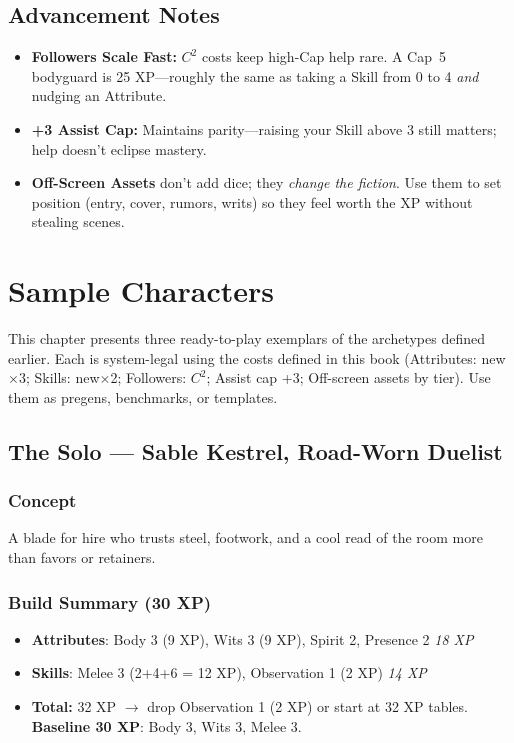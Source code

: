 \documentclass[12pt]{book}
\begin{document}
\section{Advancement Notes}
\begin{itemize}
  \item \textbf{Followers Scale Fast:} $C^2$ costs keep high-Cap help rare. A Cap~5 bodyguard is 25 XP—roughly the same as taking a Skill from 0 to 4 \emph{and} nudging an Attribute.
  \item \textbf{+3 Assist Cap:} Maintains parity—raising your Skill above 3 still matters; help doesn’t eclipse mastery.
  \item \textbf{Off-Screen Assets} don’t add dice; they \emph{change the fiction}. Use them to set position (entry, cover, rumors, writs) so they feel worth the XP without stealing scenes.
\end{itemize}
\appendix

\chapter{Sample Characters}

This chapter presents three ready-to-play exemplars of the archetypes defined earlier. Each is system-legal using the costs defined in this book (Attributes: new$\times$3; Skills: new$\times$2; Followers: $C^2$; Assist cap +3; Off-screen assets by tier). Use them as pregens, benchmarks, or templates.

\section{The Solo — Sable Kestrel, Road-Worn Duelist}

\subsection*{Concept}
A blade for hire who trusts steel, footwork, and a cool read of the room more than favors or retainers.

\subsection*{Build Summary (30 XP)}
\begin{itemize}
  \item \textbf{Attributes}: Body 3 (9 XP), Wits 3 (9 XP), Spirit 2, Presence 2 \hfill \emph{18 XP}
  \item \textbf{Skills}: Melee 3 (2+4+6 = 12 XP), Observation 1 (2 XP) \hfill \emph{14 XP}
  \item \textbf{Total:} 32 XP $\rightarrow$ drop Observation 1 (2 XP) or start at 32 XP tables. \textbf{Baseline 30 XP}: Body 3, Wits 3, Melee 3.
\end{itemize}
\end{document}

